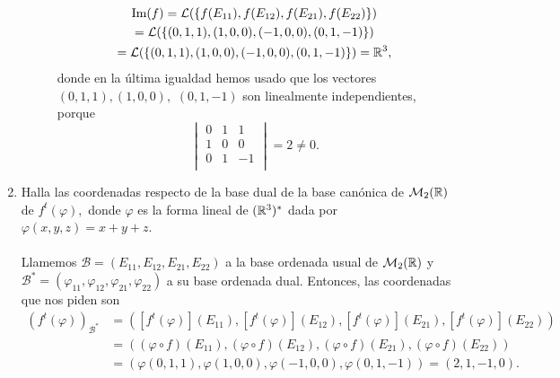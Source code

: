\documentclass[12pt]{article}
\begin{document}
\begin{ejercicio}[2.5 puntos]
\begin{enumerate}[label=(\alph*)]
\begin{description}
            \begin{gather*}
                \text{Im}(f) = \mathcal{L}(\{f(E_{11}), f(E_{12}), f(E_{21}), f(E_{22})\}) \\ 
                = \mathcal{L}(\{(0, 1, 1), (1, 0, 0), (-1, 0, 0), (0, 1, -1)\})  \\
                = \mathcal{L}(\{(0, 1, 1), (1, 0, 0), (-1, 0, 0), (0, 1, -1)\})   = {\mathbb{R}}^3,
            \end{gather*}
            donde en la última igualdad hemos usado que los vectores $(0, 1, 1), (1, 0, 0),$ $(0, 1, -1)$ son linealmente independientes, porque
            \begin{equation*}
                \begin{vmatrix}
                    0 & 1 & 1 \\
                    1 & 0 & 0 \\
                    0 & 1 & -1 \\
                \end{vmatrix} = 2 \neq 0.
            \end{equation*}
        \end{description}
        \item Halla las coordenadas respecto de la base dual de la base canónica de $\mathcal{M}_2({\mathbb{R}})$ de $f^t(\varphi),$ donde $\varphi$ es la forma lineal de $({\mathbb{R}}^3)^*$ dada por $\varphi(x, y, z) = x + y + z$. \\\\
        Llamemos $\mathcal{B} = (E_{11}, E_{12}, E_{21}, E_{22})$ a la base ordenada usual de $\mathcal{M}_2({\mathbb{R}})$ y $\mathcal{B^*} = (\varphi_{11}, \varphi_{12}, \varphi_{21}, \varphi_{22})$ a su base ordenada dual. Entonces, las coordenadas que nos piden son
        \begin{equation*}
            \begin{array}{lll}
            (f^t(\varphi))_{\mathcal{B^*}} & = ([f^t(\varphi)](E_{11}),[f^t(\varphi)](E_{12}),
            [f^t(\varphi)](E_{21}),
            [f^t(\varphi)](E_{22})) \\
             & = ((\varphi \circ f)(E_{11}),(\varphi \circ f)(E_{12}),
            (\varphi \circ f)(E_{21}),
            (\varphi \circ f)(E_{22})) \\
             & =  (\varphi(0, 1, 1),  \varphi(1, 0, 0), \varphi(-1, 0, 0), \varphi(0, 1, -1)) = (2, 1, -1, 0). \\
            \end{array}
        \end{equation*}
    \end{enumerate}
    \end{ejercicio}
\end{document}
